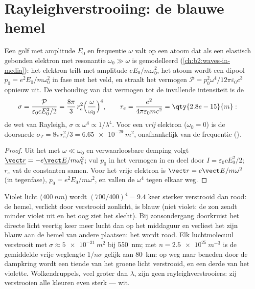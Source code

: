 \section{Rayleighverstrooiing: de blauwe hemel}

\begin{proposition}\label{prop:b2:dipole-radiation:rayleigh}
Een golf met amplitude $E_0$ en frequentie $\omega$ valt op een atoom dat
als een elastisch gebonden elektron met resonantie $\omega_0 \gg \omega$ is
gemodelleerd (\cref{ch:b2:waves-in-media}): het elektron trilt met amplitude
$eE_0/m\omega_0^2$, het atoom wordt een dipool $p_0 = e^2E_0/m\omega_0^2$ in
fase met het veld, en straalt het vermogen
$\mathcal P = p_0^2\omega^4/12\pi
\varepsilon_0c^3$ opnieuw uit. De
verhouding van dat vermogen tot de invallende intensiteit is de
\emph{}
\[
\sigma = \frac{\mathcal P}{\varepsilon_0cE_0^2/2} = \frac{8\pi}3\,r_e^2\Bigl(\frac\omega{\omega_0}\Bigr)^4 ,
\qquad r_e = \frac{e^2}{4\pi\varepsilon_0mc^2} = \qty{2.8e-15}{m} :
\]
de wet van Rayleigh, $\sigma \propto \omega^4 \propto 1/\lambda^4$. Voor een
\emph{vrij} elektron ($\omega_0 = 0$) is de doorsnede
$\sigma_T = 8\pi r_e^2/3 =
\qty{6.65e-29}{m^2}$, onafhankelijk van de
frequentie ().
\end{proposition}

\begin{proof}
Uit het  met $\omega \ll \omega_0$ en verwaarloosbare
demping volgt $\underline{\vect r} = -e\underline{\vect E}/m\omega_0^2$; vul
$p_0$ in het vermogen in en deel door $I = \varepsilon_0cE_0^2/2$; $r_e$ vat
de constanten samen. Voor het vrije elektron is
$\vect r = e\vect E/m\omega^2$ (in tegenfase), $p_0 = e^2E_0/m\omega^2$, en
vallen de $\omega^4$ tegen elkaar weg.
\end{proof}

\begin{example}\label{ex:b2:dipole-radiation:sky}
Violet licht ($\qty{400}{nm}$) wordt $(700/400)^4 = 9.4$ keer sterker
verstrooid dan rood: de hemel, verlicht door verstrooid zonlicht, is blauw
(niet violet: de zon zendt minder violet uit en het oog ziet het slecht).
Bij zonsondergang doorkruist het directe licht veertig keer meer lucht dan
op het middaguur en verliest het zijn blauw aan de hemel van andere
plaatsen: het wordt rood. Elk luchtmolecuul verstrooit met
$\sigma \approx \qty{5e-31}{m^2}$ bij \qty{550}{nm}; met
$n = \qty{2.5e25}{m^{-3}}$ is de gemiddelde vrije weglengte $1/n\sigma$
gelijk aan \qty{80}{km}: op weg naar beneden door de dampkring wordt een
tiende van het groene licht verstrooid, en een derde van het violette.
Wolkendruppels, veel groter dan $\lambda$, zijn geen rayleighverstrooiers:
zij verstrooien alle kleuren even sterk --- wit.
\end{example}

